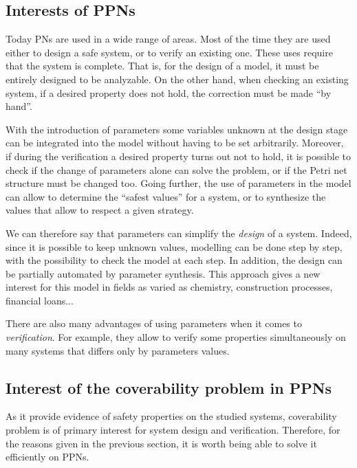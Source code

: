 \subsection{Interests of \acp{PPN}}


Today \acp{PN} are used in a wide range of areas. Most of the time they are used either to design a safe system, or to verify an existing one.
These uses require that the system is complete.
That is, for the design of a model, it must be entirely designed to be analyzable.
On the other hand, when checking an existing system, if a desired property does not hold, the correction must be made ``by hand''.

With the introduction of parameters some variables unknown at the design stage can be integrated into the model without having to be set arbitrarily. Moreover, if during the verification a desired property turns out not to hold, it is possible to check if the change of parameters alone can solve the problem, or if the Petri net structure must be changed too. Going further, the use of parameters in the model can allow to determine the ``safest values'' for a system, or to synthesize the values that allow to respect a given strategy.

We can therefore say that parameters can simplify the \emph{design} of a system. Indeed, since it is possible to keep unknown values, modelling can be done step by step, with the possibility to check the model at each step.
In addition, the design can be partially automated by parameter synthesis.
This approach gives a new interest for this model in fields as varied as chemistry, construction processes, financial loans...

There are also many advantages of using parameters when it comes to \emph{verification}.
For example, they allow to verify some properties simultaneously on many systems that differs only by parameters values.

\subsection{Interest of the coverability problem in \acp{PPN}}


As it provide evidence of safety properties on the studied systems, coverability problem is of primary interest for system design and verification. Therefore, for the reasons given in the previous section, it is worth being able to solve it efficiently on \acp{PPN}.

